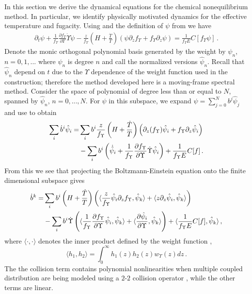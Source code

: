 \label{dynamics_sec}
In this section we derive the dynamical equations for the chemical nonequilibrium method.  In particular, we identify physically motivated dynamics for the effective temperature and fugacity.  Using  and the definition of $\psi$ from  we have
\begin{align}\label{near_equilib_eq}
\partial_t \psi+\frac{1}{f_\Upsilon }\frac{\partial f_\Upsilon }{\partial\Upsilon}\dot\Upsilon\psi-\frac{z}{f_\Upsilon }\left(H+\frac{\dot{T}}{T}\right)\left(\psi\partial_zf_\Upsilon +f_\Upsilon \partial_z \psi\right)=\frac{1}{f_\Upsilon E}C[f_\Upsilon \psi]\,.
\end{align}
Denote the monic orthogonal polynomial basis generated by the weight  by $\psi_n$, $n=0,1,...$ where $\psi_n$ is degree $n$ and call the normalized versions  $\hat{\psi}_n$. Recall that $\hat\psi_n$ depend on $t$ due to the $\Upsilon$ dependence of the weight function used in the construction; therefore the method developed here is a moving-frame spectral method. Consider the space of polynomial of degree less than or equal to $N$, spanned by $\hat\psi_n$, $n=0,...,N$.   For $\psi$ in this subspace, we expand $\psi=\sum_{j=0}^Nb^j\hat\psi_j$ and use   to obtain
\begin{align}\label{T_vars}
\sum_i \dot{b}^i\hat\psi_i=&\sum_ib^i\frac{z}{f_\Upsilon }\left(H+\frac{\dot{T}}{T}\right)\left(\partial_z(f_\Upsilon )\hat\psi_i+f_\Upsilon \partial_z\hat\psi_i\right)\\
&-\sum_ib^i\left(\dot{\hat{\psi}}_i+\frac{1}{f_\Upsilon }\frac{\partial f_\Upsilon }{\partial\Upsilon}\dot\Upsilon\hat\psi_i\right)+\frac{1}{f_\Upsilon E}C[f]\,.
\notag
\end{align}
From this we see  that  projecting the Boltzmann-Einstein equation onto the finite dimensional subspace gives
\begin{align}
\dot b^k=& \sum_i b^i\left(H+\frac{\dot{T}}{T}\right)\left(\langle\frac{z}{f_\Upsilon }\hat\psi_i\partial_zf_\Upsilon ,\hat\psi_k\rangle+\langle z\partial_z \hat\psi_i,\hat\psi_k\rangle\right) \\
&-\sum_i b^i\dot{\Upsilon}\left(\langle\frac{1}{f_\Upsilon }\frac{\partial f_\Upsilon }{\partial\Upsilon}\hat\psi_i,\hat\psi_k\rangle+\langle\frac{\partial\hat{\psi}_i}{\partial \Upsilon},\hat\psi_k\rangle\right)+\langle\frac{1}{f_\Upsilon E}C[f],\hat\psi_k\rangle\notag\,,
\end{align}
where $\langle\cdot,\cdot\rangle$ denotes the inner product defined by the weight function ,
\begin{equation}
\langle h_1,h_2\rangle=\int_0^\infty h_1(z)h_2(z)w_\Upsilon(z)dz\,.
\end{equation}
The the collision term contains polynomial nonlinearities when multiple coupled distribution are being modeled using a $2$-$2$ collision operator , while the other terms are linear.  

